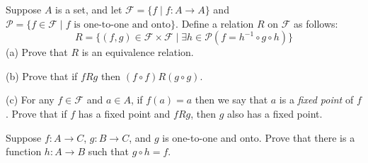 \begin{tcolorbox}[title=Problem 17, breakable]
    Suppose $A$ is a set, and let $\mathcal{F} = \{f \mid f : A \rightarrow A\}$
    and $\mathcal{P} = \{f \in \mathcal{F} \mid f \text{ is one-to-one and onto}\}$.
    Define a relation $R$ on $\mathcal{F}$ as follows:
    \[R = \{(f, g) \in \mathcal{F} \times \mathcal{F} \mid \exists{h} \in \mathcal{P}(f = h^{-1} \circ g \circ h)\}\]
    (a) Prove that $R$ is an equivalence relation.

    (b) Prove that if $f R g$ then $(f \circ f) R (g \circ g)$.

    (c) For any $f \in \mathcal{F}$ and $a \in A$, if $f(a) = a$ then we say that $a$
        is a \emph{fixed point} of $f$. Prove that if $f$ has a fixed point and $f R g$,
        then $g$ also has a fixed point.
\end{tcolorbox}

\begin{tcolorbox}[title=Problem 18, breakable]
    Suppose $f : A \rightarrow C$, $g : B \rightarrow C$, and $g$ is one-to-one and onto.
    Prove that there is a function $h : A \rightarrow B$ such that $g \circ h = f$.
\end{tcolorbox}
